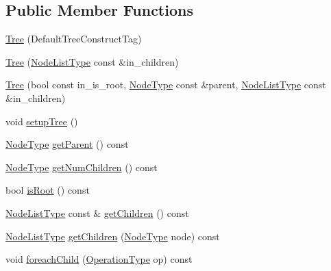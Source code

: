 \subsection*{Public Member Functions}
\begin{DoxyCompactItemize}
\item 
\hyperlink{structvt_1_1collective_1_1tree_1_1_tree_ae9570e9a8f303295744e99b527603a51}{Tree} (Default\+Tree\+Construct\+Tag)
\item 
\hyperlink{structvt_1_1collective_1_1tree_1_1_tree_ad759f716890ce5344a6c6053fcdc7055}{Tree} (\hyperlink{structvt_1_1collective_1_1tree_1_1_tree_a834e7b54ea2dceae42db7c5ea859753f}{Node\+List\+Type} const \&in\+\_\+children)
\item 
\hyperlink{structvt_1_1collective_1_1tree_1_1_tree_a949f8b592559125bf225bd3828bd6b88}{Tree} (bool const in\+\_\+is\+\_\+root, \hyperlink{namespacevt_a866da9d0efc19c0a1ce79e9e492f47e2}{Node\+Type} const \&parent, \hyperlink{structvt_1_1collective_1_1tree_1_1_tree_a834e7b54ea2dceae42db7c5ea859753f}{Node\+List\+Type} const \&in\+\_\+children)
\item 
void \hyperlink{structvt_1_1collective_1_1tree_1_1_tree_aa3120d3bdbb2a308dd6831aa52d0ebb0}{setup\+Tree} ()
\item 
\hyperlink{namespacevt_a866da9d0efc19c0a1ce79e9e492f47e2}{Node\+Type} \hyperlink{structvt_1_1collective_1_1tree_1_1_tree_ab509dada696b718152e8ac04edd551af}{get\+Parent} () const
\item 
\hyperlink{namespacevt_a866da9d0efc19c0a1ce79e9e492f47e2}{Node\+Type} \hyperlink{structvt_1_1collective_1_1tree_1_1_tree_ad68dc6aac90193cc15955d7bd1a5b1fc}{get\+Num\+Children} () const
\item 
bool \hyperlink{structvt_1_1collective_1_1tree_1_1_tree_a88b2add909b0035f4844317481ed559b}{is\+Root} () const
\item 
\hyperlink{structvt_1_1collective_1_1tree_1_1_tree_a834e7b54ea2dceae42db7c5ea859753f}{Node\+List\+Type} const  \& \hyperlink{structvt_1_1collective_1_1tree_1_1_tree_a57b3edade6230de16232213b7c4380f5}{get\+Children} () const
\item 
\hyperlink{structvt_1_1collective_1_1tree_1_1_tree_a834e7b54ea2dceae42db7c5ea859753f}{Node\+List\+Type} \hyperlink{structvt_1_1collective_1_1tree_1_1_tree_a39e27b1538bf00674a5a653dfd7a0e83}{get\+Children} (\hyperlink{namespacevt_a866da9d0efc19c0a1ce79e9e492f47e2}{Node\+Type} node) const
\item 
void \hyperlink{structvt_1_1collective_1_1tree_1_1_tree_ad5546485f90dd449a203f174b1374a01}{foreach\+Child} (\hyperlink{structvt_1_1collective_1_1tree_1_1_tree_a5ce4242e9580c807baa74168401f381a}{Operation\+Type} op) const

\end{DoxyCompactItemize}
